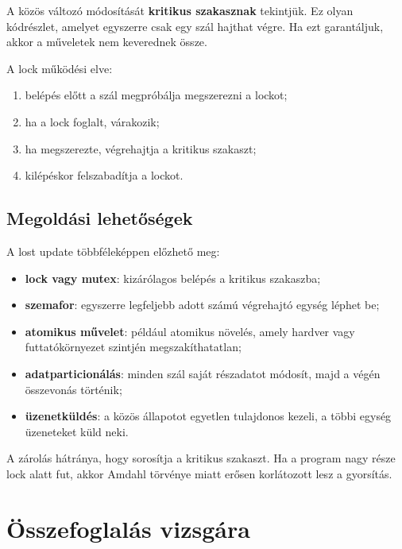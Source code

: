 A közös változó módosítását \textbf{kritikus szakasznak} tekintjük. Ez olyan kódrészlet, amelyet egyszerre csak egy szál hajthat végre. Ha ezt garantáljuk, akkor a műveletek nem keverednek össze.


A lock működési elve:

\begin{enumerate}
  \item belépés előtt a szál megpróbálja megszerezni a lockot;
  \item ha a lock foglalt, várakozik;
  \item ha megszerezte, végrehajtja a kritikus szakaszt;
  \item kilépéskor felszabadítja a lockot.
\end{enumerate}

\begin{center}

\end{center}

\subsection{Megoldási lehetőségek}

A lost update többféleképpen előzhető meg:

\begin{itemize}
  \item \textbf{lock vagy mutex}: kizárólagos belépés a kritikus szakaszba;
  \item \textbf{szemafor}: egyszerre legfeljebb adott számú végrehajtó egység léphet be;
  \item \textbf{atomikus művelet}: például atomikus növelés, amely hardver vagy futtatókörnyezet szintjén megszakíthatatlan;
  \item \textbf{adatparticionálás}: minden szál saját részadatot módosít, majd a végén összevonás történik;
  \item \textbf{üzenetküldés}: a közös állapotot egyetlen tulajdonos kezeli, a többi egység üzeneteket küld neki.
\end{itemize}

A zárolás hátránya, hogy sorosítja a kritikus szakaszt. Ha a program nagy része lock alatt fut, akkor Amdahl törvénye miatt erősen korlátozott lesz a gyorsítás.

\section{Összefoglalás vizsgára}

